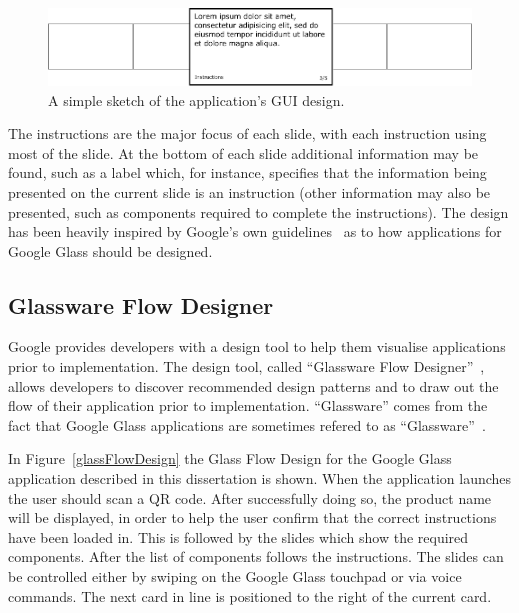 	\begin{figure}[ht!]
		\centering
		\includegraphics[width=150mm]{images/cardDesign2}
		\caption{A simple sketch of the application's GUI design.}
		\label{cardDesign}
	\end{figure}

The instructions are the major focus of each slide, with each instruction using most of the slide. At the bottom of each slide additional information may be found, such as a label which, for instance, specifies that the information being presented on the current slide is an instruction (other information may also be presented, such as components required to complete the instructions). The design has been heavily inspired by Google's own guidelines~\cite{glassDesignPrinciples} as to how applications for Google Glass should be designed.

\subsection{Glassware Flow Designer}
Google provides developers with a design tool to help them visualise applications prior to implementation. The design tool, called ``Glassware Flow Designer''~\cite{glasswareFlowDesigner}, allows developers to discover recommended design patterns and to draw out the flow of their application prior to implementation. ``Glassware'' comes from the fact that Google Glass applications are sometimes refered to as ``Glassware''~\cite{glassware}.

In Figure~\ref{glassFlowDesign} the Glass Flow Design for the Google Glass application described in this dissertation is shown. When the application launches the user should scan a QR code. After successfully doing so, the product name will be displayed, in order to help the user confirm that the correct instructions have been loaded in. This is followed by the slides which show the required components. After the list of components follows the instructions. The slides can be controlled either by swiping on the Google Glass touchpad or via voice commands. The next card in line is positioned to the right of the current card.

